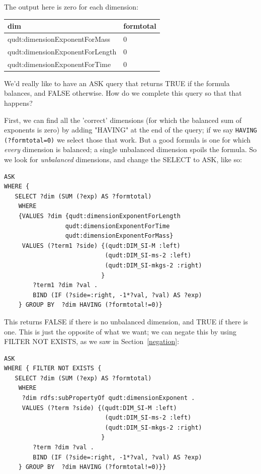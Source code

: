 The output here is zero for each dimension:

\begin{tabular}{|ll|}
\hline
dim&formtotal\\
\hline
qudt:dimensionExponentForMass&0\\
qudt:dimensionExponentForLength&0\\
qudt:dimensionExponentForTime&0\\
\hline
\end{tabular}

We'd really like to have an ASK query that returns TRUE if the 
formula balances, and FALSE otherwise.  How do we complete this query so that 
that happens? 

First, we can find all the 'correct' dimensions (for which the balanced sum of 
exponents is zero) by adding "HAVING" at the end of the query; if we say \texttt{HAVING (?formtotal=0)} we
select those that work.  But a good formula is one for which \emph{every} dimension
is balanced; a single unbalanced dimension spoils the formula.  So we look for \emph{unbalanced} 
dimensions, and change the SELECT to ASK, like so:

\begin{lstlisting}
ASK
WHERE { 
   SELECT ?dim (SUM (?exp) AS ?formtotal)
    WHERE 
    {VALUES ?dim {qudt:dimensionExponentForLength 
                 qudt:dimensionExponentForTime 
                 qudt:dimensionExponentForMass}
     VALUES (?term1 ?side) {(qudt:DIM_SI-M :left)
                            (qudt:DIM_SI-ms-2 :left)
                            (qudt:DIM_SI-mkgs-2 :right)
                           }
        ?term1 ?dim ?val .
        BIND (IF (?side=:right, -1*?val, ?val) AS ?exp)
    } GROUP BY  ?dim HAVING (?formtotal!=0)}
\end{lstlisting}

This returns FALSE if there is no unbalanced dimension, and TRUE if there is one. 
This is just the opposite of what we want; we can negate this by using
FILTER NOT EXISTS, as we saw in Section~\ref{negation}:



\begin{lstlisting}
ASK  
WHERE { FILTER NOT EXISTS {
   SELECT ?dim (SUM (?exp) AS ?formtotal)
    WHERE 
     ?dim rdfs:subPropertyOf qudt:dimensionExponent .
     VALUES (?term ?side) {(qudt:DIM_SI-M :left)
                            (qudt:DIM_SI-ms-2 :left)
                            (qudt:DIM_SI-mkgs-2 :right)
                           }
        ?term ?dim ?val .
        BIND (IF (?side=:right, -1*?val, ?val) AS ?exp)
    } GROUP BY  ?dim HAVING (?formtotal!=0)}}
\end{lstlisting}

